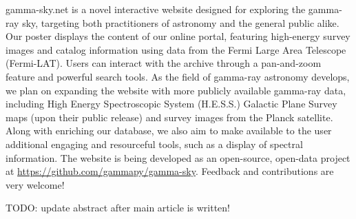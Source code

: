 gamma-sky.net is a novel interactive website designed for exploring the gamma-ray sky,
targeting both practitioners of astronomy and the general public alike. Our poster displays the
content of our online portal, featuring high-energy survey images and catalog information using
data from the Fermi Large Area Telescope (Fermi-LAT).  Users can interact with the archive
through a pan-and-zoom feature and powerful search tools. As the field of gamma-ray astronomy
develops, we plan on expanding the website with more publicly available gamma-ray data,
including High Energy Spectroscopic System (H.E.S.S.) Galactic Plane Survey maps (upon their
public release) and survey images from the Planck satellite. Along with enriching our database,
we also aim to make available to the user additional engaging and resourceful tools, such as a
display of spectral information. The website is being developed as an open-source, open-data
project at \url{https://github.com/gammapy/gamma-sky}. Feedback and contributions are very
welcome!


TODO: update abstract after main article is written!
